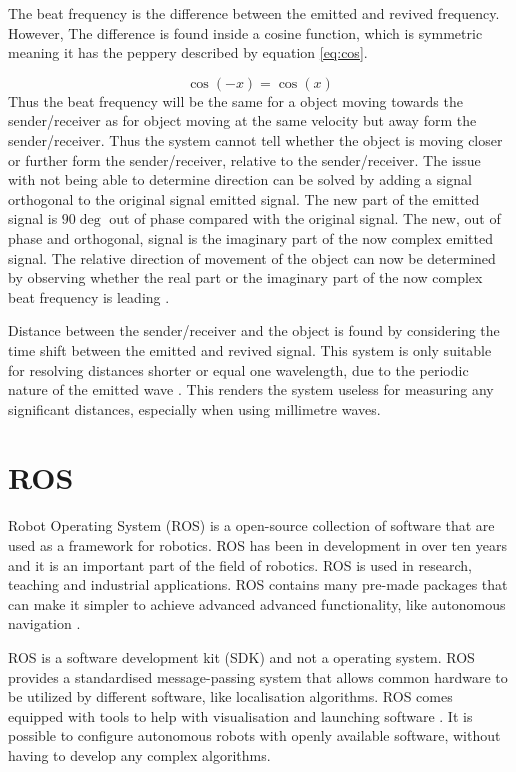 The beat frequency is the difference between the emitted and revived frequency. However, The difference is found inside a cosine function, which is symmetric meaning it has the peppery described by equation \ref{eq:cos}.

\begin{equation} \label{eq:doppler}
    \cos(-x) = \cos(x)
\end{equation}
Thus the beat frequency will be the same for a object moving towards the sender/receiver as for object moving at the same velocity but away form the sender/receiver. Thus the system cannot tell whether the object is moving closer or further form the sender/receiver, relative to the sender/receiver. The issue with not being able to determine direction can be solved by adding a signal orthogonal to the original signal emitted signal. The new part of the emitted signal is $90 \deg$ out of phase compared with the original signal. The new, out of phase and orthogonal, signal is the imaginary part of the now complex emitted signal. The relative direction of movement of the object can now be determined by observing whether the real part or the imaginary part of the now complex beat frequency is leading \cite{douglas2022fmcw}.

Distance between the sender/receiver and the object is found by considering the time shift between the emitted and revived signal. This system is only suitable for resolving distances shorter or equal one wavelength, due to the periodic nature of the emitted wave \cite{douglas2022fmcw}. This renders the system useless for measuring any significant distances, especially when using millimetre waves.   


\section{ROS}
Robot Operating System (ROS) is a open-source collection of software that are used as a framework for robotics. ROS has been in development in over ten years and it is an important part of the field of robotics. ROS is used in research, teaching and industrial applications. ROS contains many pre-made packages that can make it simpler to achieve advanced advanced functionality, like autonomous navigation \cite{WhyROS}. 

ROS is a software development kit (SDK) and not a operating system. ROS provides a standardised message-passing system that allows common hardware to be utilized by different software, like localisation algorithms. ROS comes equipped with tools to help with visualisation and launching software \cite{ROSEcosystem}. It is possible to configure autonomous robots with openly available software, without having to develop any complex algorithms.

